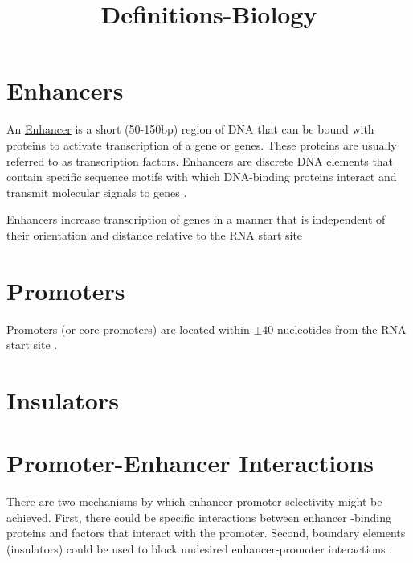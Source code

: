 \documentclass[12pt]{paper}
\begin{document}
\title{Definitions-Biology}
\maketitle
\section{Enhancers}
 An \href{http://en.wikipedia.org/wiki/Enhancer_(genetics)}{Enhancer} is a short (50-150bp) region of DNA that can be bound with proteins to activate transcription of a gene or genes. These proteins are usually referred to as transcription factors. Enhancers are discrete DNA elements that contain  specific sequence motifs with which DNA-binding proteins interact and transmit molecular signals to genes \cite{Blackwood98}.

Enhancers increase transcription of genes in a manner that is independent of their orientation and distance relative to the RNA start site \cite{Blackwood98} 


\section{Promoters}
Promoters (or core promoters) are located within $\pm 40$ nucleotides from the RNA start site \cite{Blackwood98}.

\section{Insulators}

\section{Promoter-Enhancer Interactions}
There are two mechanisms by which enhancer-promoter  selectivity might be achieved. First, there could be specific interactions between enhancer -binding proteins and factors that interact with the promoter. Second, boundary elements (insulators) could be used to block undesired enhancer-promoter interactions \cite{Blackwood98}. 


\end{document}
